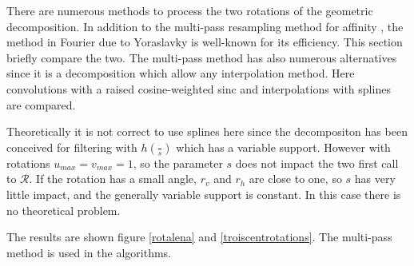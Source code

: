 
There are numerous methods to process the two rotations of the geometric decomposition. In addition to the multi-pass resampling method for affinity \cite{szeliski2010high}, the method in Fourier due to Yoraslavky \cite{unser1995convolution} is well-known for its efficiency. This section briefly compare the two. The multi-pass method has also numerous alternatives since it is a decomposition which allow any interpolation method. Here convolutions with a raised cosine-weighted sinc and interpolations with splines are compared.





Theoretically it is not correct to use splines here since the decompositon has been conceived for filtering with $h(\frac{\dot{}}{s})$ which has a variable support. However with rotations $u_{max}=v_{max}=1$, so the parameter $s$ does not impact the two first call to $\mathcal R$. If the rotation has a small angle, $r_v$ and $r_h$ are close to one, so $s$ has very little impact, and the generally variable support is constant. In this case there is no theoretical problem.

The results are shown figure \ref{rotalena} and \ref{troiscentrotations}. The multi-pass method is used in the algorithms.


